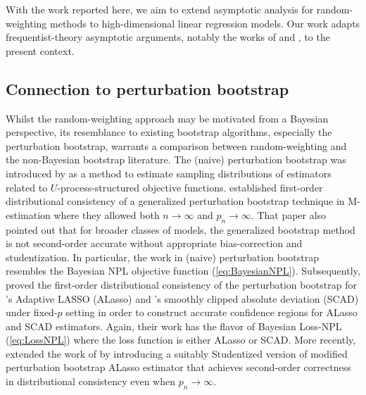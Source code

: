 \documentclass[ejs,authoryear,linksfromyear]{imsart}
\numberwithin{equation}{section}
\theoremstyle{plain}
\begin{document}
With the work reported here, we aim to extend asymptotic analysis for random-weighting methods to high-dimensional linear regression models. Our work adapts frequentist-theory asymptotic arguments, notably the works of \citet{Knight&Fu} and \citet{BinYu}, to the present context.     
 
\subsection{Connection to perturbation bootstrap}    

Whilst the random-weighting approach 
may be motivated
from a Bayesian perspective, its resemblance to  existing bootstrap algorithms, especially the perturbation bootstrap, warrants a comparison between random-weighting and the non-Bayesian bootstrap literature. 
The (naive) perturbation bootstrap was introduced by \citet{Jin2001} as a method to estimate sampling distributions of estimators related to $U$-process-structured objective functions. \citet{ChatterjeeBose2005}  established first-order distributional consistency of a generalized perturbation bootstrap technique 
in  M-estimation where they allowed both $n \to \infty$ and $p_n \to \infty$. That paper also pointed out that for broader classes of models, the generalized bootstrap method is not second-order accurate without appropriate bias-correction and studentization. In particular, the work in (naive) perturbation bootstrap resembles the Bayesian NPL objective function (\ref{eq:BayesianNPL}). Subsequently, \citet{Minnier2011} proved the first-order distributional consistency of the perturbation bootstrap for \citet{Zou2006}'s Adaptive LASSO (ALasso) and \citet{SCAD}'s smoothly clipped absolute deviation (SCAD) under fixed-$p$ setting in order to construct accurate confidence regions for ALasso and SCAD estimators. Again, their work has the flavor of Bayesian Loss-NPL (\ref{eq:LossNPL}) where the loss function is either ALasso or SCAD. More recently, \citet{DasGreg2019} extended the work of \citet{Minnier2011} by introducing a suitably Studentized version of modified perturbation bootstrap ALasso estimator that achieves second-order correctness in distributional consistency even when $p_n \to \infty$. 
\end{document}
